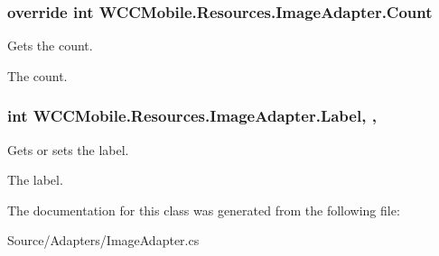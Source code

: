 \subsubsection[{\texorpdfstring{Count}{Count}}]{\setlength{\rightskip}{0pt plus 5cm}override int W\+C\+C\+Mobile.\+Resources.\+Image\+Adapter.\+Count\hspace{0.3cm}{\ttfamily [get]}}\hypertarget{class_w_c_c_mobile_1_1_resources_1_1_image_adapter_a12551c76f768e8e243b2310f938ad1a5}{}\label{class_w_c_c_mobile_1_1_resources_1_1_image_adapter_a12551c76f768e8e243b2310f938ad1a5}


Gets the count. 

The count. 
\subsubsection[{\texorpdfstring{Label}{Label}}]{\setlength{\rightskip}{0pt plus 5cm}int W\+C\+C\+Mobile.\+Resources.\+Image\+Adapter.\+Label\hspace{0.3cm}{\ttfamily [static]}, {\ttfamily [get]}, {\ttfamily [set]}}\hypertarget{class_w_c_c_mobile_1_1_resources_1_1_image_adapter_a27ed30bcea6fc0b4a0591373e4a3ae1a}{}\label{class_w_c_c_mobile_1_1_resources_1_1_image_adapter_a27ed30bcea6fc0b4a0591373e4a3ae1a}


Gets or sets the label. 

The label. 

The documentation for this class was generated from the following file\+:\begin{DoxyCompactItemize}
\item 
Source/\+Adapters/Image\+Adapter.\+cs\end{DoxyCompactItemize}
